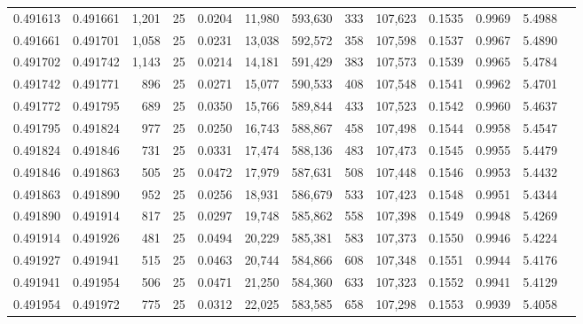 \begin{tabular}{rrrrrrrrrrrrr}
0.491613 & 0.491661 & 1,201 &  25 &                                     0.0204 &  11,980 & 593,630 &     333 & 107,623 & 0.1535 & 0.9969 & 5.4988 \\
0.491661 & 0.491701 & 1,058 &  25 &                                     0.0231 &  13,038 & 592,572 &     358 & 107,598 & 0.1537 & 0.9967 & 5.4890 \\
0.491702 & 0.491742 & 1,143 &  25 &                                     0.0214 &  14,181 & 591,429 &     383 & 107,573 & 0.1539 & 0.9965 & 5.4784 \\
0.491742 & 0.491771 &   896 &  25 &                                     0.0271 &  15,077 & 590,533 &     408 & 107,548 & 0.1541 & 0.9962 & 5.4701 \\
0.491772 & 0.491795 &   689 &  25 &                                     0.0350 &  15,766 & 589,844 &     433 & 107,523 & 0.1542 & 0.9960 & 5.4637 \\
0.491795 & 0.491824 &   977 &  25 &                                     0.0250 &  16,743 & 588,867 &     458 & 107,498 & 0.1544 & 0.9958 & 5.4547 \\
0.491824 & 0.491846 &   731 &  25 &                                     0.0331 &  17,474 & 588,136 &     483 & 107,473 & 0.1545 & 0.9955 & 5.4479 \\
0.491846 & 0.491863 &   505 &  25 &                                     0.0472 &  17,979 & 587,631 &     508 & 107,448 & 0.1546 & 0.9953 & 5.4432 \\
0.491863 & 0.491890 &   952 &  25 &                                     0.0256 &  18,931 & 586,679 &     533 & 107,423 & 0.1548 & 0.9951 & 5.4344 \\
0.491890 & 0.491914 &   817 &  25 &                                     0.0297 &  19,748 & 585,862 &     558 & 107,398 & 0.1549 & 0.9948 & 5.4269 \\
0.491914 & 0.491926 &   481 &  25 &                                     0.0494 &  20,229 & 585,381 &     583 & 107,373 & 0.1550 & 0.9946 & 5.4224 \\
0.491927 & 0.491941 &   515 &  25 &                                     0.0463 &  20,744 & 584,866 &     608 & 107,348 & 0.1551 & 0.9944 & 5.4176 \\
0.491941 & 0.491954 &   506 &  25 &                                     0.0471 &  21,250 & 584,360 &     633 & 107,323 & 0.1552 & 0.9941 & 5.4129 \\
0.491954 & 0.491972 &   775 &  25 &                                     0.0312 &  22,025 & 583,585 &     658 & 107,298 & 0.1553 & 0.9939 & 5.4058 \\

\end{tabular}
